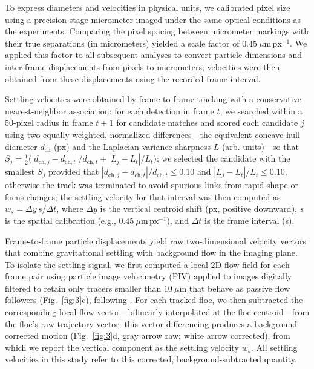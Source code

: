 \documentclass{agujournal2019}
\begin{document}
To express diameters and velocities in physical units, we calibrated pixel size using a precision stage micrometer imaged under the same optical conditions as the experiments. Comparing the pixel spacing between micrometer markings with their true separations (in micrometers) yielded a scale factor of \(0.45~\mu\mathrm{m\,px^{-1}}\). We applied this factor to all subsequent analyses to convert particle dimensions and inter-frame displacements from pixels to micrometers; velocities were then obtained from these displacements using the recorded frame interval.

Settling velocities were obtained by frame-to-frame tracking with a conservative nearest-neighbor association: for each detection in frame \(t\), we searched within a 50-pixel radius in frame \(t{+}1\) for candidate matches and scored each candidate \(j\) using two equally weighted, normalized differences—the equivalent concave-hull diameter \(d_{\mathrm{ch}}\) (px) and the Laplacian-variance sharpness \(L\) (arb. units)—so that \(S_j=\tfrac12\big(|d_{\mathrm{ch},j}-d_{\mathrm{ch},t}|/d_{\mathrm{ch},t}+|L_j-L_t|/L_t\big)\); we selected the candidate with the smallest \(S_j\) provided that \(|d_{\mathrm{ch},j}-d_{\mathrm{ch},t}|/d_{\mathrm{ch},t}\le 0.10\) and \(|L_j-L_t|/L_t\le 0.10\), otherwise the track was terminated to avoid spurious links from rapid shape or focus changes; the settling velocity for that interval was then computed as \(w_s=\Delta y\,s/\Delta t\), where \(\Delta y\) is the vertical centroid shift (px, positive downward), \(s\) is the spatial calibration (e.g., \(0.45~\mu\mathrm{m\,px^{-1}}\)), and \(\Delta t\) is the frame interval (s).


Frame-to-frame particle displacements yield raw two-dimensional velocity vectors that combine gravitational settling with background flow in the imaging plane. To isolate the settling signal, we first computed a local 2D flow field for each frame pair using particle image velocimetry (PIV) applied to images digitally filtered to retain only tracers smaller than \(10~\mu\mathrm{m}\) that behave as passive flow followers (Fig.~\ref{fig:3}c), following . For each tracked floc, we then subtracted the corresponding local flow vector—bilinearly interpolated at the floc centroid—from the floc’s raw trajectory vector; this vector differencing produces a background-corrected motion (Fig.~\ref{fig:3}d, gray arrow raw; white arrow corrected), from which we report the vertical component as the settling velocity \(w_s\). All settling velocities in this study refer to this corrected, background-subtracted quantity.
\end{document}
